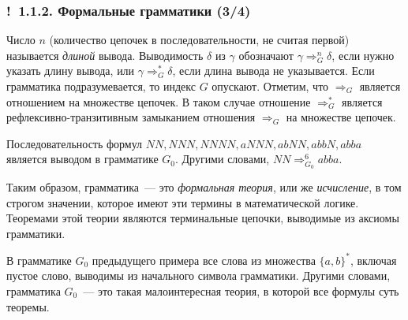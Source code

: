 \documentclass[mathserif,12pt,aspectratio=169]{beamer}
\def\emразделенной{\em разделенной}
\renewcommand{\index}[1]{}
\def\em#1{\it\color{blue}#1}
\def\odmkey#1#2{{\it\color{red} #1}\index{#2}}
\def\Ok{{\color{green}\textbf{!}\ }}
\begin{document}
\begin{frame}
\frametitle{\Ok 1.1.2. Формальные грамматики (3/4)}

Число $n$ (количество цепочек в
последовательности, не считая первой) называется
\odmkey{длиной}{Длина!вывода} вывода. Выводимость $\delta$ из
$\gamma$ обозначают 
$\gamma\Rightarrow^n_G\delta$, если нужно
указать длину вывода, или $\gamma\Rightarrow^*_G\delta$, если длина
вывода не указывается. Если грамматика подразумевается, то индекс
$G$ опускают.
Отметим, что $\Rightarrow_G$ является
отношением на множестве цепочек.
В таком случае отношение
 $\Rightarrow_{G}^{*}$ является рефлексивно-транзитивным замыканием 
 отношения $\Rightarrow_{G}$ на множестве цепочек.

\smallskip
\begin{example}
Последовательность формул $NN, NNN,  NNNN, aNNN, abNN, abbN, abba $ является выводом в грамматике $G_0$.
Другими словами, $NN\Rightarrow^6_{G_0} abba$.
\end{example}

\smallskip
\begin{remark}
Таким образом, грамматика~--- 
это {\em формальная теория}, или же
{\em исчисление}, в том строгом значении,
которое имеют эти термины в математической логике.
Теоремами этой теории являются терминальные цепочки, выводимые из аксиомы грамматики.   
\end{remark}

\smallskip
\begin{example}
В грамматике $G_0$ предыдущего примера
все слова из множества $\{a,b\}^*$, включая пустое слово, выводимы
из начального символа грамматики.
Другими словами, грамматика $G_0$~---
это такая малоинтересная теория,
в которой все формулы суть теоремы.   
\end{example}
\end{frame}
\end{document}
